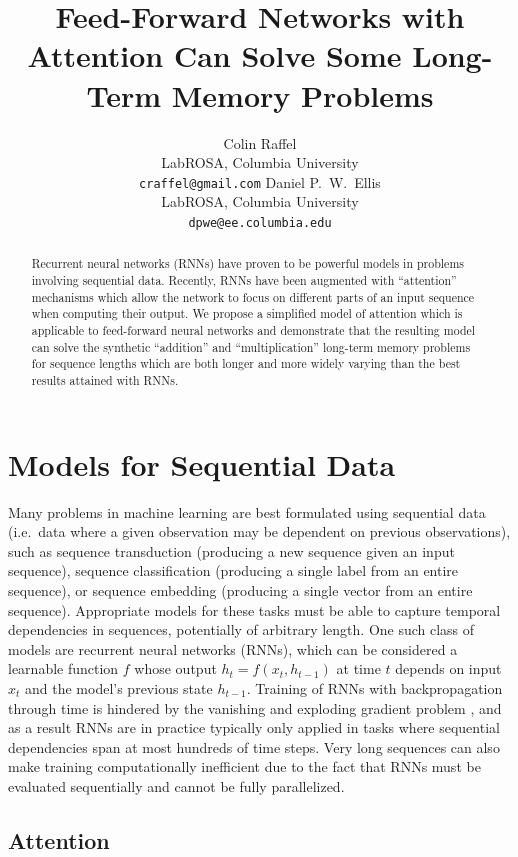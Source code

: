 \documentclass{article} %
\title{Feed-Forward Networks with Attention Can Solve Some Long-Term Memory Problems}
\author{Colin Raffel\\
LabROSA, Columbia University\\
\texttt{craffel@gmail.com}
\And
Daniel P.~W.~Ellis\\
LabROSA, Columbia University\\
\texttt{dpwe@ee.columbia.edu}
}
\begin{document}
\maketitle

\begin{abstract}
Recurrent neural networks (RNNs) have proven to be powerful models in problems involving sequential data.
Recently, RNNs have been augmented with ``attention'' mechanisms which allow the network to focus on different parts of an input sequence when computing their output.
We propose a simplified model of attention which is applicable to feed-forward neural networks and demonstrate that the resulting model can solve the synthetic ``addition'' and ``multiplication'' long-term memory problems for sequence lengths which are both longer and more widely varying than the best results attained with RNNs.
\end{abstract}

\section{Models for Sequential Data}

Many problems in machine learning are best formulated using sequential data (i.e.\ data where a given observation may be dependent on previous observations), such as sequence transduction (producing a new sequence given an input sequence), sequence classification (producing a single label from an entire sequence), or sequence embedding (producing a single vector from an entire sequence).
Appropriate models for these tasks must be able to capture temporal dependencies in sequences, potentially of arbitrary length.
One such class of models are recurrent neural networks (RNNs), which can be considered a learnable function $f$ whose output $h_t = f(x_t, h_{t - 1})$ at time $t$ depends on input $x_t$ and the model's previous state $h_{t - 1}$.
Training of RNNs with backpropagation through time \cite{werbos1990backpropagation} is hindered by the vanishing and exploding gradient problem \cite{pascanu2012difficulty,hochreiter1997long,bengio1994learning}, and as a result RNNs are in practice typically only applied in tasks where sequential dependencies span at most hundreds of time steps.
Very long sequences can also make training computationally inefficient due to the fact that RNNs must be evaluated sequentially and cannot be fully parallelized.

\subsection{Attention}
\end{document}
